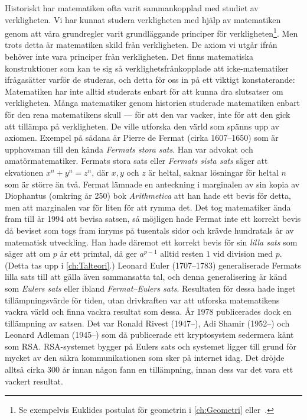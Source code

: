 Historiskt har matematiken ofta varit sammankopplad med studiet av
verkligheten.
Vi har kunnat studera verkligheten med hjälp av matematiken genom att våra
grundregler varit grundläggande principer för verkligheten\footnote{%
  Se exempelvis Euklides postulat för geometrin i \cref{ch:Geometri} eller~\cite[kap.\ 4]{Kline1990mtf1}.
}.
Men trots detta är matematiken skild från verkligheten.
De axiom vi utgår ifrån behöver inte vara principer från verkligheten.
Det finns matematiska konstruktioner som kan te sig så verklighetsfrånkopplade
att icke-matematiker ifrågasätter varför de studeras, och detta för oss in på
ett viktigt konstaterande:
Matematiken har inte alltid studerats enbart för att kunna dra slutsatser om
verkligheten.
Många matematiker genom historien studerade matematiken enbart för den rena
matematikens skull --- för att den var vacker, inte för att den gick att
tillämpa på verkligheten.
De ville utforska den värld som spänns upp av axiomen.
Exempel på sådana är Pierre de Fermat (cirka 1607--1650) som är upphovsman till 
den kända \emph{Fermats stora sats}.
Han var advokat och amatörmatematiker.
Fermats stora sats eller \emph{Fermats sista sats} säger att ekvationen
\(x^n+y^n=z^n\), där \(x,y\) och \(z\) är heltal, saknar lösningar för heltal
\(n\) som är större än två.
Fermat lämnade en anteckning i marginalen av sin kopia av Diophantus (omkring 
år 250) bok \emph{Arithmetica} att han hade ett bevis för detta, men att 
marginalen var för liten för att rymma det.
Det tog matematiker ända fram till år 1994 att bevisa satsen, så möjligen
hade Fermat inte ett korrekt bevis då beviset som togs fram inryms på tusentals 
sidor och krävde hundratals år av matematisk utveckling.
Han hade däremot ett korrekt bevis för sin \emph{lilla sats} som säger att om
\(p\) är ett primtal, då ger \(a^{p-1}\) alltid resten \(1\) vid division med
\(p\).
(Detta tas upp i \cref{ch:Talteori}.)
Leonard Euler (1707--1783) generaliserade Fermats lilla sats till att gälla även
sammansatta tal, och denna generalisering är känd som \emph{Eulers sats} eller 
ibland \emph{Fermat--Eulers sats}.
Resultaten för dessa hade inget tillämpningsvärde för tiden, utan drivkraften
var att utforska matematikens vackra värld och finna vackra resultat som dessa.
År 1978 publicerades dock en tillämpning av satsen.
Det var Ronald Rivest (1947--), Adi Shamir (1952--) och Leonard Adleman 
(1945--) som då publicerade ett kryptosystem sedermera känt som RSA\@.
RSA-systemet bygger på Eulers sats och systemet ligger till grund för
mycket av den säkra kommunikationen som sker på internet idag.
Det dröjde alltså cirka 300 år innan någon fann en tillämpning, innan dess var 
det vara ett vackert resultat.

